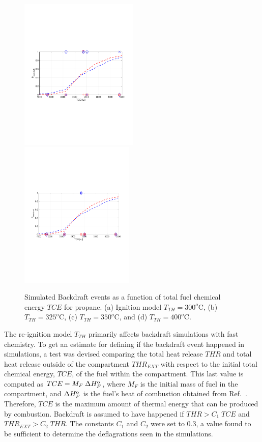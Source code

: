 \documentclass[12pt,letterpaper]{article}
\begin{document}
\begin{flushleft}
\begin{figure}[tb]
     \\
    \includegraphics[trim = 14.5mm 85mm 17mm 80mm, clip,width=0.505\textwidth]{IAFSS_Paper/Figures/PbvsTCE_Cign_LES_Extinction_2_TTH350_Propaneb.pdf}
    \includegraphics[trim = 22mm 85mm 17mm 80mm, clip,width=0.485\textwidth]{IAFSS_Paper/Figures/PbvsTCE_Cign_LES_Extinction_2_TTH400_Propaneb.pdf}
    \caption{Simulated Backdraft events as a function of total fuel chemical energy $TCE$ for propane. (a) Ignition model $T_{TH}=300^o$C, (b) $T_{TH}=325^o$C, (c) $T_{TH}=350^o$C, and (d) $T_{TH}=400^o$C. }
    \label{fig:Pb_ign}
\end{figure}
%
The re-ignition model $T_{TH}$ primarily affects backdraft simulations with fast chemistry. To get an estimate for defining if the backdraft event happened in simulations, a test was devised comparing the total heat release $THR$ and total heat release outside of the compartment $THR_{EXT}$ with respect to the initial total chemical energy, $TCE$, of the fuel within the compartment. This last value is computed as $TCE=M_F \; \Delta H_F^{\rm{o}}$, where $M_F$ is the initial mass of fuel in the compartment, and $\Delta H_F^{\rm{o}}$ is the fuel's heat of combustion obtained from Ref.~\cite{Hurley2016}. Therefore, $TCE$ is the maximum amount of thermal energy that can be produced by combustion. Backdraft is assumed to have happened if $THR>C_1 \; TCE$ and $THR_{EXT}>C_2 \; THR$. The constants $C_1$ and $C_2$ were set to 0.3, a value found to be sufficient to determine the deflagrations seen in the simulations. 


\end{flushleft}
\end{document}
